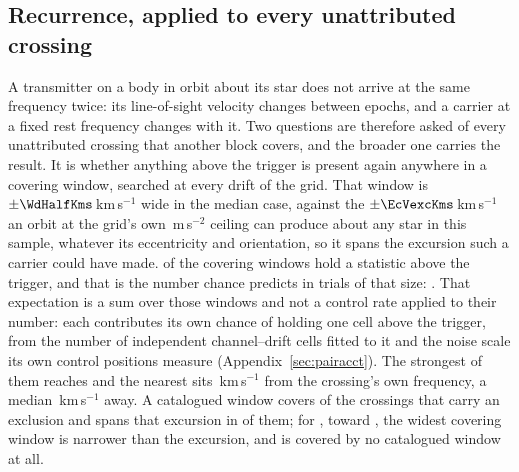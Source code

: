 \subsection{Recurrence, applied to every unattributed crossing}
\label{sec:etacrv}

A transmitter on a body in orbit about its star does not arrive at the same
frequency twice: its line-of-sight velocity changes between epochs, and a
carrier at a fixed rest frequency changes with it. Two questions are therefore
asked of every unattributed crossing that another block covers, and the
broader one carries the result. It is whether anything above the trigger is
present again anywhere in a covering window, searched at every drift of the
grid. That window is $\pm\WdHalfKms$\,km\,s$^{-1}$ wide in the median case,
against the $\pm\EcVexcKms$\,km\,s$^{-1}$ an orbit at the grid's own
\WdAGrid\,m\,s$^{-2}$ ceiling can produce about any star in this sample,
whatever its eccentricity and orientation, so it spans the excursion such a
carrier could have made. \WdNExc{} of the \WdNCov{} covering windows hold a
statistic above the trigger, and that is the number chance predicts in trials
of that size: \WdExpect. That expectation is a sum over those windows and not
a control rate applied to their number: each contributes its own chance of
holding one cell above the trigger, from the number of independent
channel--drift cells fitted to it and the noise scale its own control
positions measure
(Appendix~\ref{sec:pairacct}). The strongest of them reaches \WdExcMax{} and the
nearest sits \WdNearKms\,km\,s$^{-1}$ from the crossing's own frequency, a
median \WdMedKms\,km\,s$^{-1}$ away. A catalogued window covers \WdNOrbTot{} of the
\RcNExcl{} crossings that carry an exclusion and spans that excursion in
\EcNSpan{} of them; for \EcNShort, toward \EcShortStarList, the widest
covering window is narrower than the excursion, and \WdNNoCov{} is covered by
no catalogued window at all.

